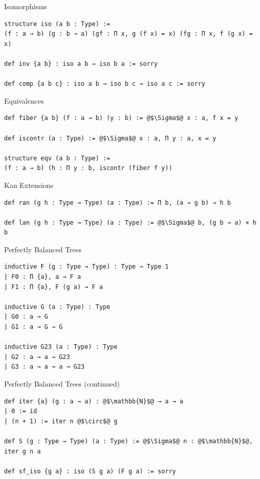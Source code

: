 \documentclass[pdf]{beamer}
\begin{document}
\begin{frame}[fragile]{Isomorphisms}
  \begin{verbatim}
structure iso (a b : Type) :=
(f : a → b) (g : b → a) (gf : Π x, g (f x) = x) (fg : Π x, f (g x) = x)

def inv {a b} : iso a b → iso b a := sorry

def comp {a b c} : iso a b → iso b c → iso a c := sorry
  \end{verbatim}
\end{frame}

\begin{frame}[fragile]{Equivalences}
  \begin{verbatim}
def fiber {a b} (f : a → b) (y : b) := @$\Sigma$@ x : a, f x = y

def iscontr (a : Type) := @$\Sigma$@ x : a, Π y : a, x = y

structure eqv (a b : Type) :=
(f : a → b) (h : Π y : b, iscontr (fiber f y))
  \end{verbatim}
\end{frame}

\begin{frame}[fragile]{Kan Extensions}
  \begin{verbatim}
def ran (g h : Type → Type) (a : Type) := Π b, (a → g b) → h b

def lan (g h : Type → Type) (a : Type) := @$\Sigma$@ b, (g b → a) × h b
  \end{verbatim}
\end{frame}

\begin{frame}[fragile]{Perfectly Balanced Trees}
  \begin{verbatim}
inductive F (g : Type → Type) : Type → Type 1
| F0 : Π {a}, a → F a
| F1 : Π {a}, F (g a) → F a

inductive G (a : Type) : Type
| G0 : a → G
| G1 : a → G → G

inductive G23 (a : Type) : Type
| G2 : a → a → G23
| G3 : a → a → a → G23
  \end{verbatim}
\end{frame}

\begin{frame}[fragile]{Perfectly Balanced Trees (continued)}
  \begin{verbatim}
def iter {a} (g : a → a) : @$\mathbb{N}$@ → a → a
| 0 := id
| (n + 1) := iter n @$\circ$@ g

def S (g : Type → Type) (a : Type) := @$\Sigma$@ n : @$\mathbb{N}$@, iter g n a

def sf_iso {g a} : iso (S g a) (F g a) := sorry
  \end{verbatim}
\end{frame}
\end{document}
